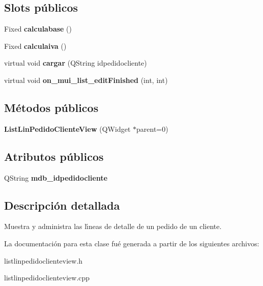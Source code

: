 \subsection*{Slots p\'{u}blicos}
\begin{CompactItemize}
\item 
Fixed {\bf calculabase} ()\label{classListLinPedidoClienteView_i0}

\item 
Fixed {\bf calculaiva} ()\label{classListLinPedidoClienteView_i1}

\item 
virtual void {\bf cargar} (QString idpedidocliente)\label{classListLinPedidoClienteView_i2}

\item 
virtual void {\bf on\_\-mui\_\-list\_\-edit\-Finished} (int, int)\label{classListLinPedidoClienteView_i3}

\end{CompactItemize}
\subsection*{M\'{e}todos p\'{u}blicos}
\begin{CompactItemize}
\item 
{\bf List\-Lin\-Pedido\-Cliente\-View} (QWidget $\ast$parent=0)\label{classListLinPedidoClienteView_a0}

\end{CompactItemize}
\subsection*{Atributos p\'{u}blicos}
\begin{CompactItemize}
\item 
QString {\bf mdb\_\-idpedidocliente}\label{classListLinPedidoClienteView_o0}

\end{CompactItemize}


\subsection{Descripci\'{o}n detallada}
Muestra y administra las l\'{\i}neas de detalle de un pedido de un cliente. 



La documentaci\'{o}n para esta clase fu\'{e} generada a partir de los siguientes archivos:\begin{CompactItemize}
\item 
listlinpedidoclienteview.h\item 
listlinpedidoclienteview.cpp\end{CompactItemize}
